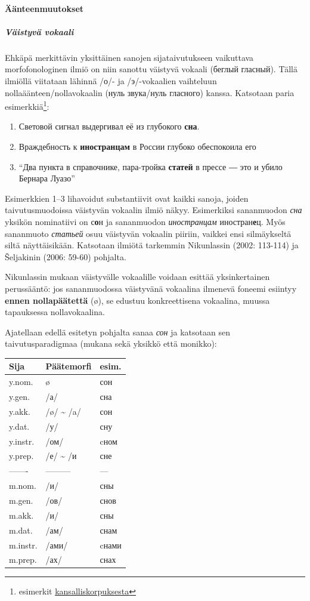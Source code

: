 \documentclass[]{scrartcl}
\providecommand{\tightlist}{%
  \setlength{\itemsep}{0pt}\setlength{\parskip}{0pt}}
\begin{document}
\paragraph{Äänteenmuutokset}\label{uxe4uxe4nteenmuutokset}

\subparagraph{Väistyvä vokaali}\label{vuxe4istyvuxe4-vokaali}

Ehkäpä merkittävin yksittäinen sanojen sijataivutukseen vaikuttava
morfofonologinen ilmiö on niin sanottu väistyvä vokaali (беглый
гласный). Tällä ilmiöllä viitataan lähinnä /о/- ja /э/-vokaalien
vaihteluun nollaäänteen/nollavokaalin (нуль звука/нуль гласного) kanssa.
Katsotaan paria esimerkkiä\footnote{esimerkit
  \href{http://ruscorpora.ru}{kansalliskorpuksesta}}:

\begin{enumerate}
\def\labelenumi{(\arabic{enumi})}
\tightlist
\item
  Световой сигнал выдергивал её из глубокого \textbf{сна}.
\item
  Враждебность к \textbf{иностранцам} в России глубоко обеспокоила его
\item
  ``Два пункта в справочнике, пара-тройка \textbf{статей} в прессе ― это
  и убило Бернара Луазо''
\end{enumerate}

Esimerkkien 1--3 lihavoidut substantiivit ovat kaikki sanoja, joiden
taivutusmuodoissa väistyvän vokaalin ilmiö näkyy. Esimerkiksi
sananmuodon \emph{сна} yksikön nominatiivi on с\textbf{о}н ja
sananmuodon \emph{иностранцам} иностран\textbf{е}ц. Myös sananmuoto
\emph{статьей} osuu väistyvän vokaalin piiriin, vaikkei ensi
silmäykseltä siltä näyttäisikään. Katsotaan ilmiötä tarkemmin
Nikunlassin (2002: 113-114) ja Šeljakinin (2006: 59-60) pohjalta.

Nikunlassin mukaan väistyvälle vokaalille voidaan esittää yksinkertainen
perussääntö: jos sananmuodossa väistyvänä vokaalina ilmenevä foneemi
esiintyy \textbf{ennen nollapäätettä} (ø), se edustuu konkreettisena
vokaalina, muussa tapauksessa nollavokaalina.

Ajatellaan edellä esitetyn pohjalta sanaa \emph{сон} ja katsotaan sen
taivutusparadigmaa (mukana sekä yksikkö että monikko):

\begin{longtable}[c]{@{}lll@{}}
\toprule
Sija & Päätemorfi & esim.\tabularnewline
\midrule
\endhead
y.nom. & ø & сон\tabularnewline
y.gen. & /а/ & сна\tabularnewline
y.akk. & /ø/ \textasciitilde{} /a/ & сон\tabularnewline
y.dat. & /у/ & сну\tabularnewline
y.instr. & /ом/ & cном\tabularnewline
y.prep. & /е/ \textasciitilde{} /и & сне\tabularnewline
------- & --------- & ---\tabularnewline
m.nom. & /и/ & сны\tabularnewline
m.gen. & /ов/ & снов\tabularnewline
m.akk. & /и/ & сны\tabularnewline
m.dat. & /ам/ & снам\tabularnewline
m.instr. & /ами/ & cнами\tabularnewline
m.prep. & /ах/ & снах\tabularnewline
\bottomrule
\end{longtable}
\end{document}
